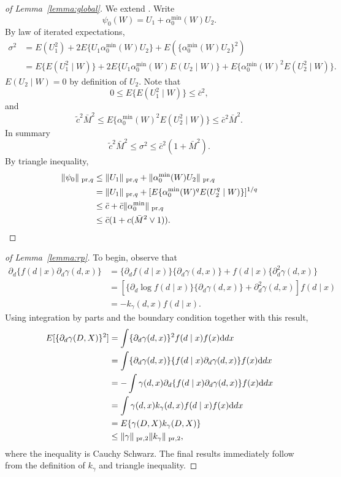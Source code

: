 \begin{proof}[of Lemma~\ref{lemma:global}]
We extend \cite[Lemma 3.3]{chernozhukov2018global}. Write
$$
\psi_0(W)=U_1+\alpha_0^{\min}(W)U_2.
$$
By law of iterated expectations,
\begin{align*}
    \sigma^2
&=E(U_1^2)+2E\{U_1\alpha_0^{\min}(W)U_2\}+ E(\{\alpha_0^{\min}(W)U_2\}^2) \\
&=E\{E(U_1^2 \mid W)\}+2E\{U_1\alpha_0^{\min}(W) E(U_2 \mid W)\}+ E\{\alpha_0^{\min}(W)^2 E(U_2^2 \mid W)\}.
\end{align*}
$E(U_2 \mid W)=0$ by definition of $U_2$. Note that
$$
0 \leq E\{E(U_1^2 \mid W)\} \leq \bar{c}^2,
$$
and
$$
\tilde{c}^2 \bar{M}^2 \leq E\{\alpha_0^{\min}(W)^2 E(U_2^2 \mid W)\} \leq \bar{c}^2\bar{M}^2.
$$
In summary
$$
\tilde{c}^2 \bar{M}^2 \leq \sigma^2 \leq \bar{c}^2 (1+\bar{M}^2).
$$
By triangle inequality,
\begin{align*}
   \|\psi_0\|_{\text{ \normalfont pr},q} &
   \leq \|U_1\|_{\text{ \normalfont pr},q} + \|\alpha_0^{\min}(W)U_2\|_{\text{ \normalfont pr},q}  \\
    &=\|U_1\|_{\text{ \normalfont pr},q} + [E\{\alpha_0^{\min}(W)^q E( U_2^q \mid W)\}]^{1/q} \\
    &\leq \bar{c}+ \bar{c} \|\alpha^{\min}_0\|_{\text{ \normalfont pr},q}   \\
    &\leq \bar{c}(1+c(\bar{M}^2\vee 1)).
\end{align*}
\end{proof}



\begin{proof}[of Lemma~\ref{lemma:rp}]
To begin, observe that
\begin{align*}
    \partial_d \{ f(d\mid x) \partial_d \gamma(d,x)\}
    &= \{\partial_df(d\mid x)\}\{\partial_d \gamma(d,x)\}+f(d\mid x) \{\partial^2_d\gamma(d,x)\}\\
    &= [\{\partial_d \log f(d \mid x)\}\{\partial_d \gamma(d,x)\}+ \partial^2_d\gamma(d,x)]f(d \mid x) \\
    &=-k_{\gamma}(d,x)f(d \mid x).
\end{align*}
Using integration by parts and the boundary condition together with this result,
\begin{align*}
    E [\{\partial_d \gamma(D,X)\}^2]
    &=\int \{\partial_d \gamma(d,x)\}^2 f(d \mid x) f(x) \mathrm{d}dx \\
    &=\int \{\partial_d \gamma(d,x)\} \{ f(d\mid x) \partial_d \gamma(d,x)\} f(x) \mathrm{d}dx \\
    &=-\int \gamma(d,x) \partial_d \{ f(d\mid x) \partial_d \gamma(d,x)\} f(x) \mathrm{d}dx \\
    &=\int \gamma(d,x) k_{\gamma}(d,x) f(d\mid x)f(x) \mathrm{d}dx \\
    &=E \{\gamma(D,X) k_{\gamma}(D,X)\} \\
    &\leq \|\gamma\|_{\text{ \normalfont pr},2} \|k_{\gamma}\|_{\text{ \normalfont pr},2},
\end{align*}
where the inequality is Cauchy Schwarz. The final results immediately follow from the definition of $k_{\gamma}$ and triangle inequality.
\end{proof}


